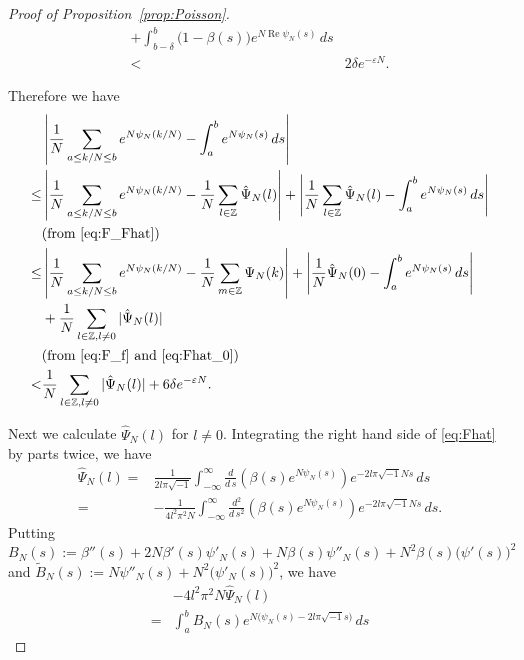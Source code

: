 \documentclass[a4paper,dvipdfmx]{amsart}
\theoremstyle{plain}
\theoremstyle{definition}
\theoremstyle{remark}
\newcommand{\Z}{\mathbb{Z}}
\renewcommand{\Re}{\operatorname{Re}}
\renewcommand{\i}{\sqrt{-1}}
\numberwithin{equation}{section}
\begin{document}
\begin{proof}[Proof of Proposition~\ref{prop:Poisson}]
\begin{equation}
\begin{split}
  +
  \int_{b-\delta}^{b}\bigl(1-\beta(s)\bigr)e^{N\Re{\psi_N(s)}}\,ds
  \\
  <&
  2\delta e^{-\varepsilon N}.
\end{split}
\end{equation}
\par
Therefore we have
\begin{equation}\label{eq:f_sum_int}
\begin{split}
  &\left|
    \frac{1}{N}\sum_{a\le k/N\le b}e^{N\psi_N(k/N)}
    -
    \int_{a}^{b}e^{N\psi_N(s)}\,ds
  \right|
  \\
  \le&
  \left|
    \frac{1}{N}\sum_{a\le k/N\le b}e^{N\psi_N(k/N)}
    -
    \frac{1}{N}
    \sum_{l\in\Z}\hat\Psi_N(l)
  \right|
  +
  \left|
    \frac{1}{N}
    \sum_{l\in\Z}\hat\Psi_N(l)
    -
    \int_{a}^{b}e^{N\psi_N(s)}\,ds
  \right|
  \\
  &\text{(from \eqref{eq:F_Fhat})}
  \\
  \le&
  \left|
    \frac{1}{N}\sum_{a\le k/N\le b}e^{N\psi_N(k/N)}
    -
    \frac{1}{N}
    \sum_{m\in\Z}\Psi_N(k)
  \right|
  +
  \left|
    \frac{1}{N}\hat\Psi_N(0)
    -
    \int_{a}^{b}e^{N\psi_N(s)}\,ds
  \right|
  \\
  &+
  \frac{1}{N}
  \sum_{l\in\Z,l\ne0}|\hat\Psi_N(l)|
  \\
  &\text{(from \eqref{eq:F_f} and \eqref{eq:Fhat_0})}
  \\
  <&
  \frac{1}{N}
  \sum_{l\in\Z,l\ne0}|\hat\Psi_N(l)|
  +
  6\delta e^{-\varepsilon N}.
\end{split}
\end{equation}
\par
Next we calculate $\hat\Psi_N(l)$ for $l\ne0$.
Integrating the right hand side of \eqref{eq:Fhat} by parts twice, we have
\begin{align*}
  \hat\Psi_N(l)
  =&
  \frac{1}{2l\pi\i}
  \int_{-\infty}^{\infty}
  \frac{d}{d\,s}\left(\beta(s)e^{N \psi_N(s)}\right)e^{-2l\pi\i Ns}\,ds
  \\
  =&
  -\frac{1}{4l^2\pi^2 N}
  \int_{-\infty}^{\infty}
  \frac{d^2}{d\,s^2}\left(\beta(s)e^{N \psi_N(s)}\right)e^{-2l\pi\i Ns}\,ds.
\end{align*}
Putting $B_N(s):=\beta''(s)+2N\beta'(s)\psi'_N(s)+N\beta(s)\psi''_N(s)+N^2\beta(s)\bigl(\psi'(s)\bigr)^{2}$ and $\tilde{B}_N(s):=N\psi''_N(s)+N^2\bigl(\psi'_N(s)\bigr)^{2}$, we have
\begin{align*}
  &-4l^2\pi^2N\hat\Psi_N(l)
  \\
  =&
  \int_{a}^{b}
  B_N(s)e^{N\bigl(\psi_N(s)-2l\pi\i s\bigr)}\,ds

\end{align*}
\end{proof}
\end{document}
